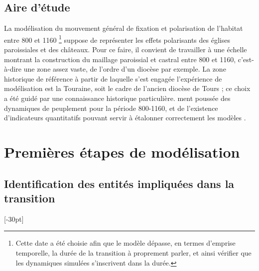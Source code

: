 \documentclass[12pt, a4paper, oneside]{book}
\begin{document}
	\subsection{Aire d'étude}	
	
	La modélisation du mouvement général de fixation et polarisation de l'habitat entre 800 et 1160 \footnote{
		Cette date a été choisie afin que le modèle dépasse, en termes d’emprise temporelle, la durée de la transition à proprement parler, et ainsi vérifier que les dynamiques simulées s’inscrivent dans la durée.
	} suppose de représenter les effets polarisants des églises paroissiales et des châteaux.
	Pour ce faire, il convient de travailler à une échelle montrant la construction du maillage paroissial et castral entre 800 et 1160, c'est-à-dire une zone assez vaste, de l'ordre d'un diocèse par exemple.
	La zone historique de référence à partir de laquelle s'est engagée l'expérience de modélisation est la Touraine, soit le cadre de l'ancien diocèse de Tours ; ce choix a été guidé par une connaissance historique particulière.
	ment poussée des dynamiques de peuplement pour la période 800-1160, et de l'existence d'indicateurs quantitatifs pouvant servir à étalonner correctement les modèles \autocite{zadora-rio_paroisses_2008}.
	
	\section{Premières étapes de modélisation}
	
	\subsection{Identification des entités impliquées dans la transition}[-30pt]
	
\end{document}
